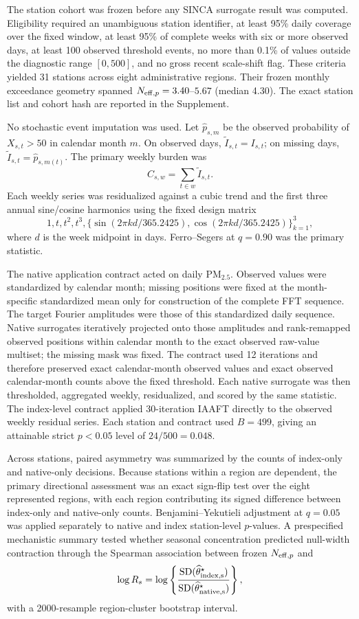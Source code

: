 The station cohort was frozen before any SINCA surrogate result was computed. Eligibility required an unambiguous station identifier, at least 95\% daily coverage over the fixed window, at least 95\% of complete weeks with six or more observed days, at least 100 observed threshold events, no more than 0.1\% of values outside the diagnostic range $[0,500]$, and no gross recent scale-shift flag. These criteria yielded 31 stations across eight administrative regions. Their frozen monthly exceedance geometry spanned $N_{\mathrm{eff},p}=3.40$--$5.67$ (median 4.30). The exact station list and cohort hash are reported in the Supplement.

No stochastic event imputation was used. Let $\widehat p_{s,m}$ be the observed probability of $X_{s,t}>50$ in calendar month $m$. On observed days, $\widetilde I_{s,t}=I_{s,t}$; on missing days, $\widetilde I_{s,t}=\widehat p_{s,m(t)}$. The primary weekly burden was
\[
C_{s,w}=\sum_{t\in w}\widetilde I_{s,t}.
\]
Each weekly series was residualized against a cubic trend and the first three annual sine/cosine harmonics using the fixed design matrix
\[
1,t,t^2,t^3,\{\sin(2\pi k d/365.2425),\cos(2\pi k d/365.2425)\}_{k=1}^{3},
\]
where $d$ is the week midpoint in days. Ferro--Segers at $q=0.90$ was the primary statistic.

The native application contract acted on daily PM$_{2.5}$. Observed values were standardized by calendar month; missing positions were fixed at the month-specific standardized mean only for construction of the complete FFT sequence. The target Fourier amplitudes were those of this standardized daily sequence. Native surrogates iteratively projected onto those amplitudes and rank-remapped observed positions within calendar month to the exact observed raw-value multiset; the missing mask was fixed. The contract used 12 iterations and therefore preserved exact calendar-month observed values and exact observed calendar-month counts above the fixed threshold. Each native surrogate was then thresholded, aggregated weekly, residualized, and scored by the same statistic. The index-level contract applied 30-iteration IAAFT directly to the observed weekly residual series. Each station and contract used $B=499$, giving an attainable strict $p<0.05$ level of $24/500=0.048$.

Across stations, paired asymmetry was summarized by the counts of index-only and native-only decisions. Because stations within a region are dependent, the primary directional assessment was an exact sign-flip test over the eight represented regions, with each region contributing its signed difference between index-only and native-only counts. Benjamini--Yekutieli adjustment at $q=0.05$ was applied separately to native and index station-level $p$-values. A prespecified mechanistic summary tested whether seasonal concentration predicted null-width contraction through the Spearman association between frozen $N_{\mathrm{eff},p}$ and
\[
\log R_s=\log\left\{\frac{\operatorname{SD}(\widehat\theta^\star_{\rm index,s})}{\operatorname{SD}(\widehat\theta^\star_{\rm native,s})}\right\},
\]
with a 2000-resample region-cluster bootstrap interval.

